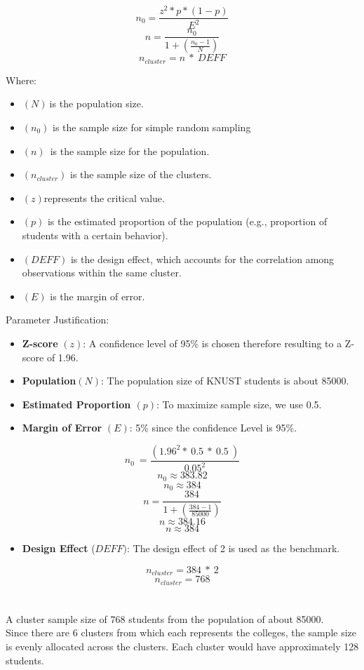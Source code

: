 \documentclass[doublespacing]{report} %
\begin{document}
\[n_0=\frac{z^2\ast p\ast\left(1-p\right)}{E^2}\]
\[n=\frac{n_0}{1+(\frac{n_0-1}{N})}\]
\[n_{cluster}=n\ \ast\ DEFF\]

Where:
\begin{itemize}
    \item \((N)\ \)is the population size.
    \item \((n_0)\) is the sample size for simple random sampling
    \item \((n)\)\ is the sample size for the population.
    \item \((n_{cluster})\) is the sample size of the clusters.
    \item \((z) \)represents the critical value.
    \item \((p)\) is the estimated proportion of the population (e.g., proportion of students with a certain behavior).
    \item \((DEFF) \) is the design effect, which accounts for the correlation among observations within the same cluster.
    \item \((E) \) is the margin of error.
\end{itemize}

Parameter Justification:

\begin{itemize}
    \item \textbf{Z-score} \((z)\): A confidence level of 95\% is chosen therefore resulting to a Z-score of 1.96.
    \item \textbf{Population}\( (N)\): The population size of KNUST students is about 85000.
    \item \textbf{Estimated Proportion \((p)\)}: To maximize sample size, we use 0.5.
    \item \textbf{Margin of Error }\((E)\): 5\% since the confidence Level is 95\%.


\end{itemize}


\[n_0\ =\frac{\left({1.96}^2\ast\ 0.5\ \ast\ 0.5\ \right)}{{0.05}^2}\]
\[n_0\approx383.82\]
\[n_0\approx384\]
\[n=\frac{384}{1+(\frac{384-1}{85000})}\]
\[n\approx384.16\]
\[n\approx384\]

\begin{itemize}
    \item \textbf{Design Effect} (\({DEFF})\): The design effect of 2 is used as the benchmark.

\end{itemize}
\[n_{cluster}=384\ \ast\ 2\]
\[n_{cluster}=768\]
\\
\\A cluster sample size of 768 students from the population of about 85000.
\\Since there are 6 clusters from which each represents the colleges, the sample size is evenly allocated across the clusters. Each cluster would have approximately 128 students.
\end{document}
